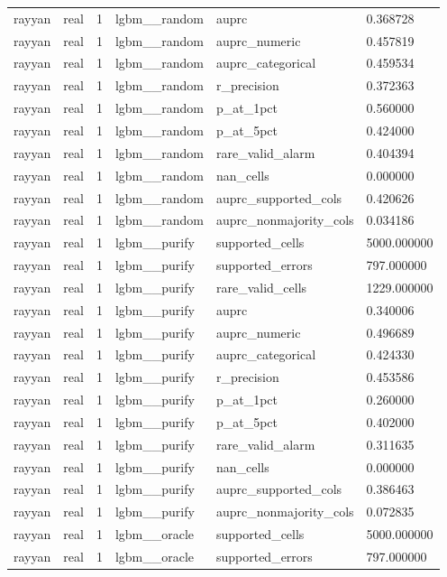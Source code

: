 \begin{tabular}{llllll}
rayyan & real & 1 & lgbm\_\_random & auprc & 0.368728 \\
rayyan & real & 1 & lgbm\_\_random & auprc\_numeric & 0.457819 \\
rayyan & real & 1 & lgbm\_\_random & auprc\_categorical & 0.459534 \\
rayyan & real & 1 & lgbm\_\_random & r\_precision & 0.372363 \\
rayyan & real & 1 & lgbm\_\_random & p\_at\_1pct & 0.560000 \\
rayyan & real & 1 & lgbm\_\_random & p\_at\_5pct & 0.424000 \\
rayyan & real & 1 & lgbm\_\_random & rare\_valid\_alarm & 0.404394 \\
rayyan & real & 1 & lgbm\_\_random & nan\_cells & 0.000000 \\
rayyan & real & 1 & lgbm\_\_random & auprc\_supported\_cols & 0.420626 \\
rayyan & real & 1 & lgbm\_\_random & auprc\_nonmajority\_cols & 0.034186 \\
rayyan & real & 1 & lgbm\_\_purify & supported\_cells & 5000.000000 \\
rayyan & real & 1 & lgbm\_\_purify & supported\_errors & 797.000000 \\
rayyan & real & 1 & lgbm\_\_purify & rare\_valid\_cells & 1229.000000 \\
rayyan & real & 1 & lgbm\_\_purify & auprc & 0.340006 \\
rayyan & real & 1 & lgbm\_\_purify & auprc\_numeric & 0.496689 \\
rayyan & real & 1 & lgbm\_\_purify & auprc\_categorical & 0.424330 \\
rayyan & real & 1 & lgbm\_\_purify & r\_precision & 0.453586 \\
rayyan & real & 1 & lgbm\_\_purify & p\_at\_1pct & 0.260000 \\
rayyan & real & 1 & lgbm\_\_purify & p\_at\_5pct & 0.402000 \\
rayyan & real & 1 & lgbm\_\_purify & rare\_valid\_alarm & 0.311635 \\
rayyan & real & 1 & lgbm\_\_purify & nan\_cells & 0.000000 \\
rayyan & real & 1 & lgbm\_\_purify & auprc\_supported\_cols & 0.386463 \\
rayyan & real & 1 & lgbm\_\_purify & auprc\_nonmajority\_cols & 0.072835 \\
rayyan & real & 1 & lgbm\_\_oracle & supported\_cells & 5000.000000 \\
rayyan & real & 1 & lgbm\_\_oracle & supported\_errors & 797.000000 \\

\end{tabular}
